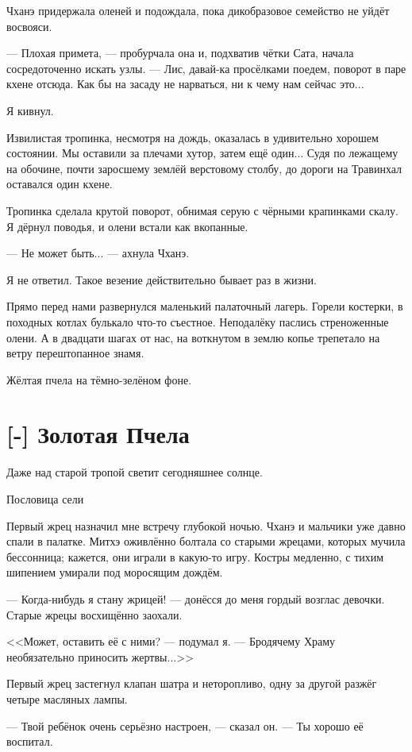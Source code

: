 Чханэ придержала оленей и подождала, пока дикобразовое семейство не уйдёт восвояси.

--- Плохая примета, --- пробурчала она и, подхватив чётки Сата, начала сосредоточенно искать узлы.
--- Лис, давай-ка просёлками поедем, поворот в паре кхене отсюда.
Как бы на засаду не нарваться, ни к чему нам сейчас это...

Я кивнул.

Извилистая тропинка, несмотря на дождь, оказалась в удивительно хорошем состоянии.
Мы оставили за плечами хутор, затем ещё один...
Судя по лежащему на обочине, почти заросшему землёй верстовому столбу, до дороги на Травинхал оставался один кхене.

Тропинка сделала крутой поворот, обнимая серую с чёрными крапинками скалу.
Я дёрнул поводья, и олени встали как вкопанные.

--- Не может быть... --- ахнула Чханэ.

Я не ответил.
Такое везение действительно бывает раз в жизни.

Прямо перед нами развернулся маленький палаточный лагерь.
Горели костерки, в походных котлах булькало что-то съестное.
Неподалёку паслись стреноженные олени.
А в двадцати шагах от нас, на воткнутом в землю копье трепетало на ветру перештопанное знамя.

Жёлтая пчела на тёмно-зелёном фоне.

\section{[-] Золотая Пчела}

\epigraph
{Даже над старой тропой светит сегодняшнее солнце.}
{Пословица сели}

Первый жрец назначил мне встречу глубокой ночью.
Чханэ и мальчики уже давно спали в палатке.
Митхэ оживлённо болтала со старыми жрецами, которых мучила бессонница;
кажется, они играли в какую-то игру.
Костры медленно, с тихим шипением умирали под моросящим дождём.

--- Когда-нибудь я стану жрицей! --- донёсся до меня гордый возглас девочки.
Старые жрецы восхищённо заохали.

<<Может, оставить её с ними? --- подумал я.
--- Бродячему Храму необязательно приносить жертвы...>>

Первый жрец застегнул клапан шатра и неторопливо, одну за другой разжёг четыре масляных лампы.

--- Твой ребёнок очень серьёзно настроен, --- сказал он.
--- Ты хорошо её воспитал.

